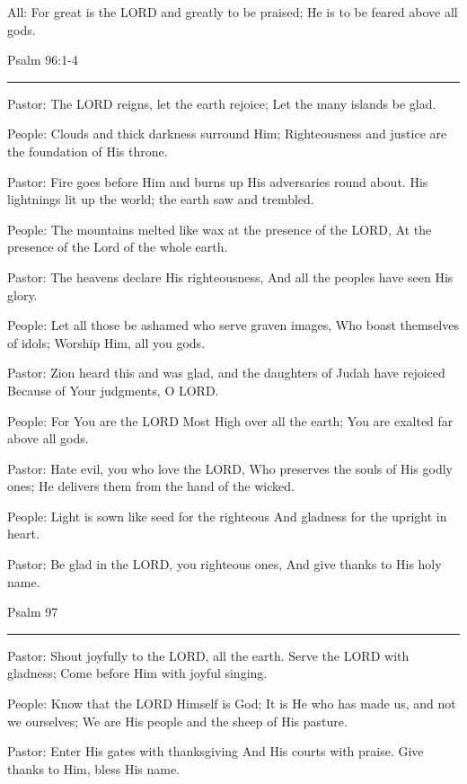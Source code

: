 \documentclass[]{book}
\begin{document}
All: For great is the LORD and greatly to be praised; He is to be feared above all gods.

Psalm 96:1-4 \textbar{}

\begin{center}\rule{0.5\linewidth}{\linethickness}\end{center}

Pastor: The LORD reigns, let the earth rejoice; Let the many islands be glad.

People: Clouds and thick darkness surround Him; Righteousness and justice are the foundation of His throne.

Pastor: Fire goes before Him and burns up His adversaries round about. His lightnings lit up the world; the earth saw and trembled.

People: The mountains melted like wax at the presence of the LORD, At the presence of the Lord of the whole earth.

Pastor: The heavens declare His righteousness, And all the peoples have seen His glory.

People: Let all those be ashamed who serve graven images, Who boast themselves of idols; Worship Him, all you gods.

Pastor: Zion heard this and was glad, and the daughters of Judah have rejoiced Because of Your judgments, O LORD.

People: For You are the LORD Most High over all the earth; You are exalted far above all gods.

Pastor: Hate evil, you who love the LORD, Who preserves the souls of His godly ones; He delivers them from the hand of the wicked.

People: Light is sown like seed for the righteous And gladness for the upright in heart.

Pastor: Be glad in the LORD, you righteous ones, And give thanks to His holy name.

Psalm 97 \textbar{}

\begin{center}\rule{0.5\linewidth}{\linethickness}\end{center}

Pastor: Shout joyfully to the LORD, all the earth. Serve the LORD with gladness; Come before Him with joyful singing.

People: Know that the LORD Himself is God; It is He who has made us, and not we ourselves; We are His people and the sheep of His pasture.

Pastor: Enter His gates with thanksgiving And His courts with praise. Give thanks to Him, bless His name.
\end{document}

